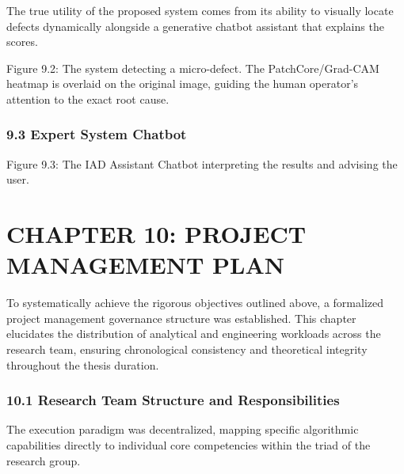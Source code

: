 \documentclass[12pt, a4paper, oneside]{report}
\begin{document}
The true utility of the proposed system comes from its ability to visually locate defects dynamically alongside a generative chatbot assistant that explains the scores.

Figure 9.2: The system detecting a micro-defect. The PatchCore/Grad-CAM heatmap is overlaid on the original image, guiding the human operator's attention to the exact root cause.

\subsection{9.3 Expert System Chatbot}\label{expert-system-chatbot}

Figure 9.3: The IAD Assistant Chatbot interpreting the results and advising the user.

\bigskip\noindent\hrulefill\bigskip

\chapter{CHAPTER 10: PROJECT MANAGEMENT PLAN}\label{chapter-10-project-management-plan}

To systematically achieve the rigorous objectives outlined above, a formalized project management governance structure was established. This chapter elucidates the distribution of analytical and engineering workloads across the research team, ensuring chronological consistency and theoretical integrity throughout the thesis duration.

\subsection{10.1 Research Team Structure and Responsibilities}\label{research-team-structure-and-responsibilities}

The execution paradigm was decentralized, mapping specific algorithmic capabilities directly to individual core competencies within the triad of the research group.
\end{document}
